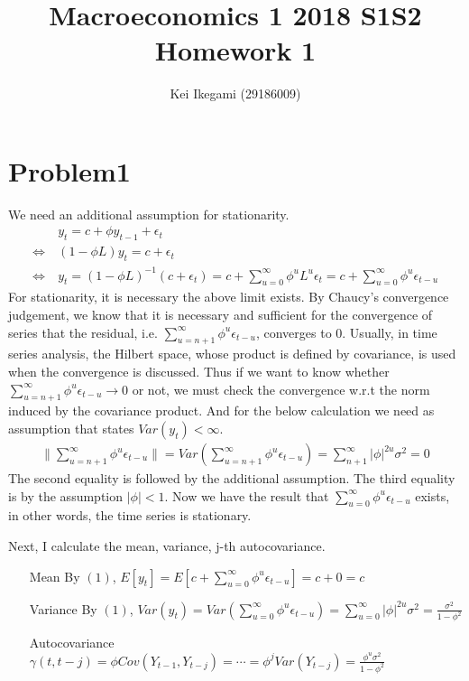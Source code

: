 \documentclass{article}
\begin{document}
\title{Macroeconomics 1 2018 S1S2 \\ 
Homework 1}
\author{Kei Ikegami (29186009)}
\maketitle

\section{Problem1}
 We need an additional assumption for stationarity.
 \begin{align}
 	&y_t = c + \phi y_{t-1} + \epsilon_t \nonumber \\
	\Leftrightarrow\ &(1-\phi L)y_t = c + \epsilon_t \nonumber \\
	\Leftrightarrow\ & y_t = (1-\phi L)^{-1} (c + \epsilon_t) = c + \sum_{u = 0}^{\infty} \phi^u L^u \epsilon_t = c + \sum_{u = 0}^{\infty} \phi^u \epsilon_{t-u}
 \end{align}
 For stationarity, it is necessary the above limit exists.  By Chaucy's convergence judgement, we know that it is necessary and sufficient for the convergence of series that the residual, i.e. $\sum_{u = n+1}^{\infty} \phi^u \epsilon_{t-u}$, converges to $0$. Usually, in time series analysis, the Hilbert space, whose product is defined by covariance, is used when the convergence is discussed. Thus if we want to know whether $\sum_{u = n+1}^{\infty} \phi^u \epsilon_{t-u} \to 0$ or not, we must check the convergence w.r.t the norm induced by the covariance product. And for the below calculation we need as assumption that states $Var(y_t) < \infty$. 
\begin{align*}
	\| \sum_{u = n+1}^{\infty} \phi^u \epsilon_{t-u} \| = Var(\sum_{u = n+1}^{\infty} \phi^u \epsilon_{t-u}) = \sum_{n+1}^{\infty} |\phi|^{2u}\sigma^2 = 0
\end{align*}
The second equality is followed by the additional assumption. The third equality is by the assumption $|\phi| < 1$. Now we have the result that $\sum_{u = 0}^{\infty} \phi^u \epsilon_{t-u}$ exists, in other words, the time series is stationary.

Next, I calculate the mean, variance, j-th autocovariance.
\begin{itemize}
	\item[Mean] By $(1)$, $E[y_t] = E\left[ c + \sum_{u = 0}^{\infty} \phi^u \epsilon_{t-u} \right] = c + 0 = c$
	\item[Variance] By $(1)$, $Var(y_t) = Var\left( \sum_{u = 0}^{\infty} \phi^u \epsilon_{t-u} \right) = \sum_{u=0}^{\infty} |\phi|^{2u} \sigma^2 = \frac{\sigma^2}{1-\phi^2}$
	\item[Autocovariance] $\gamma(t,t-j) = \phi Cov(Y_{t-1}, Y_{t-j}) = \cdots = \phi^j Var(Y_{t-j}) = \frac{\phi^u \sigma^2}{1-\phi^2}$
\end{itemize}
\end{document}
